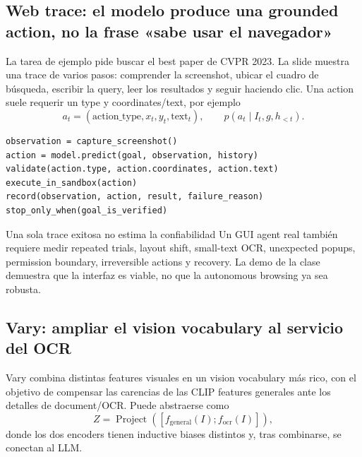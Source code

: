 
\subsection{Web trace: el modelo produce una grounded action, no la frase «sabe usar el navegador»}

La tarea de ejemplo pide buscar el best paper de CVPR 2023. La slide muestra una trace de varios pasos: comprender la screenshot, ubicar el cuadro de búsqueda, escribir la query, leer los resultados y seguir haciendo clic. Una action suele requerir un type y coordinates/text, por ejemplo
\[
a_t=(\text{action\_type},x_t,y_t,\text{text}_t),
\qquad
p(a_t\mid I_t,g,h_{<t}).
\]


\begin{lstlisting}[caption={Action schema mínimo con capacidad de auditoría para un GUI agent}]
observation = capture_screenshot()
action = model.predict(goal, observation, history)
validate(action.type, action.coordinates, action.text)
execute_in_sandbox(action)
record(observation, action, result, failure_reason)
stop_only_when(goal_is_verified)
\end{lstlisting}

\begin{warningbox}{Una sola trace exitosa no estima la confiabilidad}
Un GUI agent real también requiere medir repeated trials, layout shift, small-text OCR, unexpected popups, permission boundary, irreversible actions y recovery. La demo de la clase demuestra que la interfaz es viable, no que la autonomous browsing ya sea robusta.
\end{warningbox}

\subsection{Vary: ampliar el vision vocabulary al servicio del OCR}

Vary combina distintas features visuales en un vision vocabulary más rico, con el objetivo de compensar las carencias de las CLIP features generales ante los detalles de document/OCR. Puede abstraerse como
\[
Z=\operatorname{Project}\!\left([f_{\text{general}}(I);f_{\text{ocr}}(I)]\right),
\]
donde los dos encoders tienen inductive biases distintos y, tras combinarse, se conectan al LLM.


